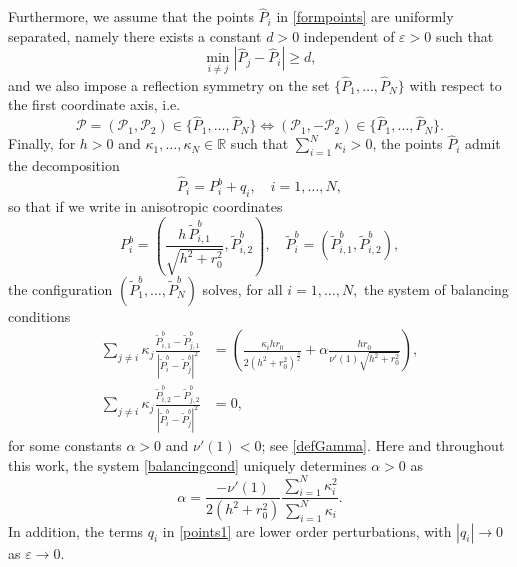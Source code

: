 \documentclass[11pt,reqno,a4paper]{amsart}
\numberwithin{equation}{section}
\newcommand{\R}{\mathbb{R}}
\newcommand{\ve}{\varepsilon}
\begin{document}
Furthermore, we assume that the points $\widehat{P}_i$ in \eqref{formpoints} are uniformly separated, namely there exists a constant $d>0$ independent of $\ve>0$ such that 
\begin{equation}\label{unifdistance}
\min_{i\neq j} |\widehat{P}_j-\widehat{P}_i|\geq d,
\end{equation}
and we also impose a reflection symmetry on the set $\{\widehat{P}_1,\dots,\widehat{P}_N\}$ with respect to the first coordinate axis, i.e.
\begin{equation}\label{symmetryforpoints}
\mathcal{P}=(\mathcal{P}_{1},\mathcal{P}_{2}) \in \{\widehat{P}_1,\dots,\widehat{P}_N\} \iff (\mathcal{P}_{1},-\mathcal{P}_{2}) \in \{\widehat{P}_1,\dots,\widehat{P}_N\}.\end{equation} 
Finally, for $h>0$ and  $\kappa_1,\dots,\kappa_N\in\R$ such that $\sum\limits_{i=1}^{N}\kappa_i>0$, the points $\widehat{P}_i$ admit the decomposition
\begin{equation}\label{points1}
\widehat{P}_i=P_i^{b}+q_i, \quad i=1,\dots,N,
\end{equation}
so that if we write in anisotropic coordinates 
\begin{equation}\label{rescaledmainpoints}
{P}^{b}_i=\left(\frac{h\,\widetilde{P}^{b}_{i,1}}{\sqrt{h^2+r_0^2}},\widetilde{P}^{b}_{i,2}\right), \quad \widetilde{P}^{b}_i=\left(\widetilde{P}^{b}_{i,1},\widetilde{P}^{b}_{i,2}\right),
\end{equation}
the configuration $\left(\widetilde{P}^{b}_{1},\dots,\widetilde{P}^{b}_{N}\right)$ solves, for all $i=1,\dots,N,$ the system of balancing conditions
\begin{equation}\label{balancingcond}
\begin{aligned}
\sum_{j \neq i} \kappa_j\frac{\widetilde{P}^{b}_{i,1}-\widetilde{P}^{b}_{j,1}}{|\widetilde{P}^{b}_i-\widetilde{P}^{b}_j|^2}&=\left(\frac{\kappa_ih r_0}{2(h^2+r_0^2)^{\frac 3 2}}+\alpha\frac{h r_0}{\nu'(1)\sqrt{h^2+r_0^2}}\right),  \\
\sum_{j \neq i} \kappa_j\frac{\widetilde{P}^{b}_{i,2}-\widetilde{P}^{b}_{j,2}}{|\widetilde{P}^{b}_i-\widetilde{P}^{b}_j|^2}&=0,
\end{aligned}
\end{equation}
for some constants $\alpha>0$ and $\nu'(1)<0$; see \eqref{defGamma}. Here and throughout this work, the system \eqref{balancingcond} uniquely determines $\alpha>0$ as  
\begin{equation}\label{uniformspeed}
\alpha=\frac{-\nu'(1)}{2(h^2+r_0^2)}\frac{\sum\limits_{i=1}^{N} \kappa_i^2}{\sum\limits_{i=1}^{N}\kappa_{i}}.
\end{equation}
In addition, the terms ${q}_i$ in \eqref{points1} are lower order perturbations, with $|q_i|\to 0$ as $\ve \to 0$. 
\end{document}
